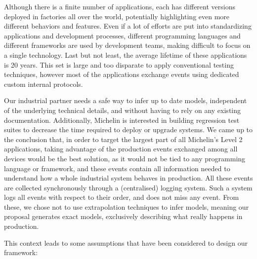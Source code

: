 Although there is a finite number of applications, each has
different versions deployed in factories all over the world,
potentially highlighting even more different behaviors and
features. Even if a lot of efforts are put into standardizing
applications and development processes, different programming
languages and different frameworks are used by development
teams, making difficult to focus on a single technology. Last
but not least, the average lifetime of these applications is 20
years. This set is large and too disparate to apply conventional
testing techniques, however most of the applications exchange
events using dedicated custom internal protocols.

Our industrial partner needs a safe way to infer up to date
models, independent of the underlying technical details, and
without having to rely on any existing documentation.
Additionally, Michelin is interested in building regression test
suites to decrease the time required to deploy or upgrade
systems. We came up to the conclusion that, in order to target
the largest part of all Michelin's Level 2 applications, taking
advantage of the production events exchanged among all devices
would be the best solution, as it would not be tied to any
programming language or framework, and these events contain all
information needed to understand how a whole industrial system
behaves in production. All these events are collected
synchronously through a (centralised) logging system. Such a
system logs all events with respect to their order, and does not
miss any event.  From these, we chose not to use extrapolation
techniques to infer models, meaning our proposal generates
exact models, exclusively describing what really happens
in production.

This context leads to some assumptions that have been considered
to design our framework:

